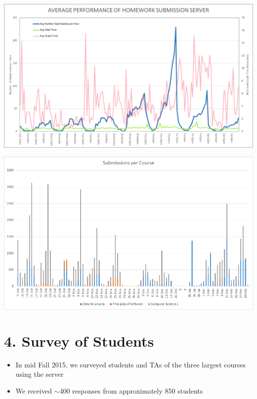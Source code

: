 \documentclass[thesis]{hmcposter}
\begin{document}
\begin{poster}
\begin{center}
\includegraphics[width=12in]{avg_sub_wait_time}
\end{center}

\begin{center}
\includegraphics[width=12in]{stacked_bar_graph}
\end{center}

\columnbreak

\section{4. Survey of Students}%
\begin{itemize}
    \item In mid Fall 2015, we surveyed students and TAs of the three largest courses using the server
    \item We received $\sim$400 responses from approximately 850 students
\end{itemize}


\end{poster}
\end{document}
